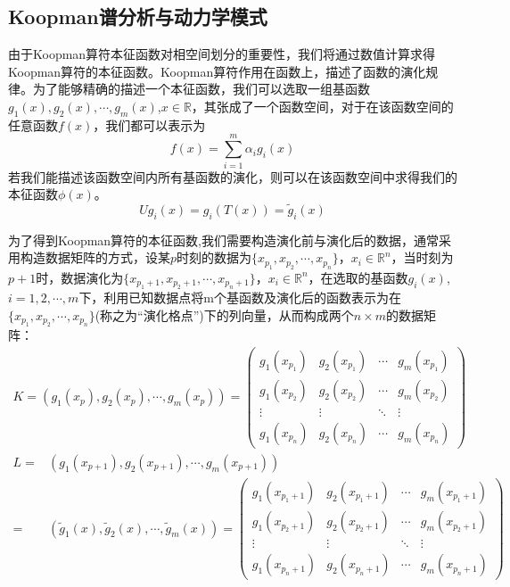 \subsection{Koopman谱分析与动力学模式}\label{section:Koop_dyna}

由于Koopman算符本征函数对相空间划分的重要性，我们将通过数值计算求得Koopman算符的本征函数。Koopman算符作用在函数上，描述了函数的演化规律。为了能够精确的描述一个本征函数，我们可以选取一组基函数$g_1(x),g_2(x),\cdots,g_m(x)$,$x\in \mathbb{R}$，其张成了一个函数空间，对于在该函数空间的任意函数$f(x)$，我们都可以表示为
\begin{equation}
    f(x)=\sum_{i=1}^m\alpha_ig_i(x)
\end{equation}
若我们能描述该函数空间内所有基函数的演化，则可以在该函数空间中求得我们的本征函数$\phi(x)$。
\begin{equation}
    Ug_i(x)=g_i(T(x))=\tilde{g}_i(x)
\end{equation}

为了得到Koopman算符的本征函数,我们需要构造演化前与演化后的数据，通常采用构造数据矩阵的方式，设某$p$时刻的数据为$\{x_{p_1},x_{p_2},\cdots,x_{p_n}\}$，$x_i\in \mathbb{R}^n$，当时刻为$p+1$时，数据演化为$\{x_{p_1+1},x_{p_2+1},\cdots,x_{p_n+1}\}$，$x_i\in \mathbb{R}^n$，在选取的基函数${g_i(x)}$,$i=1,2,\cdots,m$下，利用已知数据点将m个基函数及演化后的函数表示为在$\{x_{p_1},x_{p_2},\cdots,x_{p_n}\}$(称之为“演化格点”)下的列向量，从而构成两个$n\times m$的数据矩阵：
\begin{equation}
    \begin{aligned}
        K=(g_1(x_p),g_2(x_p),\cdots,g_m(x_p))=
        \begin{pmatrix}
        g_1(x_{p_1}) & g_2(x_{p_1}) & \cdots & g_m(x_{p_1}) \\
        g_1(x_{p_2}) & g_2(x_{p_2}) & \cdots & g_m(x_{p_2}) \\
        \vdots       & \vdots       & \ddots & \vdots \\
        g_1(x_{p_n}) & g_2(x_{p_n}) & \cdots & g_m(x_{p_n})
        \end{pmatrix}
    \end{aligned}
\end{equation}
\begin{equation}
    \begin{aligned}
    L=&(g_1(x_{p+1}),g_2(x_{p+1}),\cdots,g_m(x_{p+1}))\\
    =&(\tilde{g}_1(x),\tilde{g}_2(x),\cdots,\tilde{g}_m(x))=
        \begin{pmatrix}
        g_1(x_{p_1+1}) & g_2(x_{p_1+1}) & \cdots & g_m(x_{p_1+1}) \\
        g_1(x_{p_2+1}) & g_2(x_{p_2+1}) & \cdots & g_m(x_{p_2+1}) \\
        \vdots         & \vdots         & \ddots & \vdots \\
        g_1(x_{p_n+1}) & g_2(x_{p_n+1}) & \cdots & g_m(x_{p_n+1})
        \end{pmatrix}
    \end{aligned}
\end{equation}

